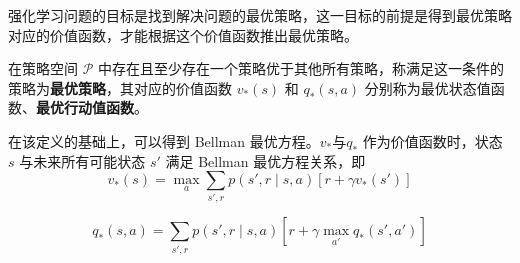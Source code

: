 

强化学习问题的目标是找到解决问题的最优策略，这一目标的前提是得到最优策略对应的价值函数，才能根据这个价值函数推出最优策略。

\begin{definition}
    在策略空间 $\mathcal{P}$ 中存在且至少存在一个策略优于其他所有策略，称满足这一条件的策略为\textbf{最优策略}，其对应的价值函数 $v_*(s)$ 和 $q_*(s,a)$ 分别称为{最优状态值函数}、\textbf{最优行动值函数}。
\end{definition}

在该定义的基础上，可以得到 Bellman 最优方程\cite{howard1960dynamic}。$v_*$与$q_*$ 作为价值函数时，状态 $s$ 与未来所有可能状态 $s'$ 满足 Bellman 最优方程关系，即
    \begin{equation}\label{eq:v_star}
        v_*(s)=\max_{a}\sum_{s',r}p(s',r \mid s,a)[r+\gamma v_*(s')]
    \end{equation}
    
    \begin{equation}\label{eq:q_star}
    q_*(s,a) = \sum_{s',r}p(s',r \mid s,a)\left[r+\gamma \max_{a'}q_*(s',a') \right]
\end{equation}



